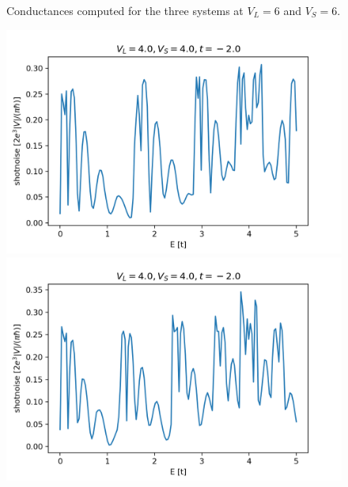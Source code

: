 \documentclass[12pt]{article}
\numberwithin{equation}{section}
\begin{document}
\begin{figure}
\begin{minipage}{0.333\textwidth}
  \end{minipage}
  \caption{Conductances computed for the three systems at $V_L=6$ and $V_S=6$.}
\end{figure}


\newpage
\begin{figure}
  \centering
  \begin{minipage}{0.333\textwidth}
      \centering
      \includegraphics[width=1.0\textwidth]{./media/shotnoise_2deg_W4_L10_VL4_0_VS4_0.png} %
  \end{minipage}\hfill
  \begin{minipage}{0.333\textwidth}
      \centering
      \includegraphics[width=1.0\textwidth]{./media/shotnoise_2deg_W5_L10_VL4_0_VS4_0.png} %
  \end{minipage}\hfill

\end{figure}
\end{document}
